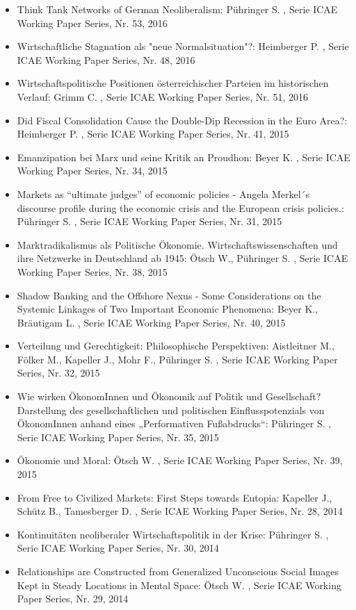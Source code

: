 \begin{itemize}
\item Think Tank Networks of German Neoliberalism: Pühringer S. , Serie ICAE Working Paper Series, Nr. 53, 2016
\item Wirtschaftliche Stagnation als "neue Normalsituation"?: Heimberger P. , Serie ICAE Working Paper Series, Nr. 48, 2016
\item Wirtschaftspolitische Positionen österreichischer Parteien im historischen Verlauf: Grimm C. , Serie ICAE Working Paper Series, Nr. 51, 2016
\item Did Fiscal Consolidation Cause the Double-Dip Recession in the Euro Area?: Heimberger P. , Serie ICAE Working Paper Series, Nr. 41, 2015
\item Emanzipation bei Marx und seine Kritik an Proudhon: Beyer K. , Serie ICAE Working Paper Series, Nr. 34, 2015
\item Markets as “ultimate judges” of economic policies - Angela Merkel´s discourse profile during the economic crisis and the European crisis policies.: Pühringer S. , Serie ICAE Working Paper Series, Nr. 31, 2015
\item Marktradikalismus als Politische Ökonomie. Wirtschaftswissenschaften und ihre Netzwerke in Deutschland ab 1945: Ötsch W., Pühringer S. , Serie ICAE Working Paper Series, Nr. 38, 2015
\item Shadow Banking and the Offshore Nexus - Some Considerations on the Systemic Linkages of Two Important Economic Phenomena: Beyer K., Bräutigam L. , Serie ICAE Working Paper Series, Nr. 40, 2015
\item Verteilung und Gerechtigkeit: Philosophische Perspektiven: Aistleitner M., Fölker M., Kapeller J., Mohr F., Pühringer S. , Serie ICAE Working Paper Series, Nr. 32, 2015
\item Wie wirken ÖkonomInnen und Ökonomik auf Politik und Gesellschaft? Darstellung des gesellschaftlichen und politischen Einflusspotenzials von ÖkonomInnen anhand eines „Performativen Fußabdrucks“: Pühringer S. , Serie ICAE Working Paper Series, Nr. 35, 2015
\item Ökonomie und Moral: Ötsch W. , Serie ICAE Working Paper Series, Nr. 39, 2015
\item From Free to Civilized Markets: First Steps towards Eutopia: Kapeller J., Schütz B., Tamesberger D. , Serie ICAE Working Paper Series, Nr. 28, 2014
\item Kontinuitäten neoliberaler Wirtschaftspolitik in der Krise: Pühringer S. , Serie ICAE Working Paper Series, Nr. 30, 2014
\item Relationships are Constructed from Generalized Unconscious Social Images Kept in Steady Locations in Mental Space: Ötsch W. , Serie ICAE Working Paper Series, Nr. 29, 2014

\end{itemize}

